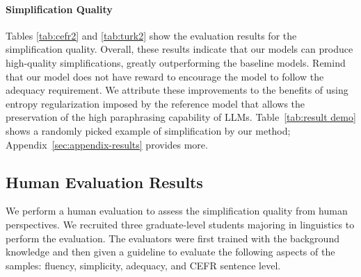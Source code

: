 \paragraph{Simplification Quality }
Tables \ref{tab:cefr2} and \ref{tab:turk2} show the evaluation results for the simplification quality. 
Overall, these results indicate that our models can produce high-quality simplifications, greatly outperforming the baseline models. 
Remind that our model does not have reward to encourage the model to follow the adequacy requirement.
We attribute these improvements to the benefits of using entropy regularization imposed by the reference model that allows the preservation of the high paraphrasing capability of LLMs.
Table~\ref{tab:result demo} shows a randomly picked example of simplification by our method; Appendix~\ref{sec:appendix-results} provides more. 





\subsection{Human Evaluation Results} \label{sec:human}
We perform a human evaluation to assess the simplification quality from human perspectives. 
We recruited three graduate-level students majoring in linguistics to perform the evaluation. 
The evaluators were first trained with the background knowledge and then given a guideline to evaluate the following aspects of the samples: fluency, simplicity, adequacy, and CEFR sentence level. 

